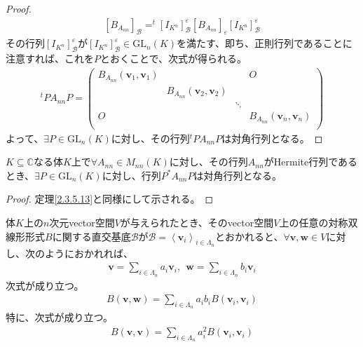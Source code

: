 \documentclass[dvipdfmx]{jsarticle}
\begin{document}
\begin{proof}
\begin{align*}
\left[ B_{A_{nn}} \right]_{\mathcal{B}} =^{t}\left[ I_{K^{n}} \right]^{\varepsilon}_{\mathcal{B}}\left[ B_{A_{nn}} \right]_{\varepsilon}\left[ I_{K^{n}} \right]^{\varepsilon}_{\mathcal{B}}
\end{align*}
その行列$\left[ I_{K^{n}} \right]^{\varepsilon}_{\mathcal{B}}$が$\left[ I_{K^{n}} \right]^{\varepsilon}_{\mathcal{B}} \in {\mathrm{GL}}_{n}(K)$を満たす、即ち、正則行列であることに注意すれば、これを$P$とおくことで、次式が得られる。
\begin{align*}
^{t}PA_{nn}P = \begin{pmatrix}
B_{A_{nn}}\left( \mathbf{v}_{1},\mathbf{v}_{1} \right) & \  & \  & O \\
\  & B_{A_{nn}}\left( \mathbf{v}_{2},\mathbf{v}_{2} \right) & \  & \  \\
\  & \  & \ddots & \  \\
O & \  & \  & B_{A_{nn}}\left( \mathbf{v}_{n},\mathbf{v}_{n} \right) \\
\end{pmatrix}
\end{align*}
よって、$\exists P \in {\mathrm{GL}}_{n}(K)$に対し、その行列$^{t}PA_{nn}P$は対角行列となる。
\end{proof}
\begin{thm}\label{2.3.5.14}
$K \subseteq \mathbb{C}$なる体$K$上で$\forall A_{nn} \in M_{nn}(K)$に対し、その行列$A_{nn}$がHermite行列であるとき、$\exists P \in {\mathrm{GL}}_{n}(K)$に対し、行列$P^{*}A_{nn}P$は対角行列となる。
\end{thm}
\begin{proof} 定理\ref{2.3.5.13}と同様にして示される。
\end{proof}
\begin{thm}\label{2.3.5.15}
体$K$上の$n$次元vector空間$V$が与えられたとき、そのvector空間$V$上の任意の対称双線形形式$B$に関する直交基底$\mathcal{B}$が$\mathcal{B} =\left\langle \mathbf{v}_{i} \right\rangle_{i \in \varLambda_{n}}$とおかれると、$\forall\mathbf{v},\mathbf{w} \in V$に対し、次のようにおかれれば、
\begin{align*}
\mathbf{v} = \sum_{i \in \varLambda_{n}} {a_{i}\mathbf{v}_{i}},\ \ \mathbf{w} = \sum_{i \in \varLambda_{n}} {b_{i}\mathbf{v}_{i}}
\end{align*}
次式が成り立つ。
\begin{align*}
B\left( \mathbf{v},\mathbf{w} \right) = \sum_{i \in \varLambda_{n}} {a_{i}b_{i}B\left( \mathbf{v}_{i},\mathbf{v}_{i} \right)}
\end{align*}
特に、次式が成り立つ。
\begin{align*}
B\left( \mathbf{v},\mathbf{v} \right) = \sum_{i \in \varLambda_{n}} {a_{i}^{2}B\left( \mathbf{v}_{i},\mathbf{v}_{i} \right)}
\end{align*}
\end{thm}
\end{document}
